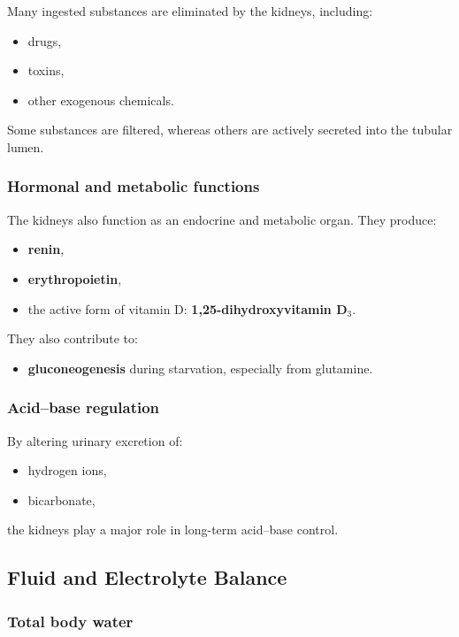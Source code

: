 \documentclass[11pt,a4paper]{article}
\begin{document}
Many ingested substances are eliminated by the kidneys, including:
\begin{itemize}
    \item drugs,
    \item toxins,
    \item other exogenous chemicals.
\end{itemize}

Some substances are filtered, whereas others are actively secreted into the tubular lumen.

\subsubsection{Hormonal and metabolic functions}

The kidneys also function as an endocrine and metabolic organ. They produce:
\begin{itemize}
    \item \textbf{renin},
    \item \textbf{erythropoietin},
    \item the active form of vitamin D: \textbf{1,25-dihydroxyvitamin D$_3$}.
\end{itemize}

They also contribute to:
\begin{itemize}
    \item \textbf{gluconeogenesis} during starvation, especially from glutamine.
\end{itemize}

\subsubsection{Acid--base regulation}

By altering urinary excretion of:
\begin{itemize}
    \item hydrogen ions,
    \item bicarbonate,
\end{itemize}
the kidneys play a major role in long-term acid--base control.

\subsection{Fluid and Electrolyte Balance}

\subsubsection{Total body water}
\end{document}
